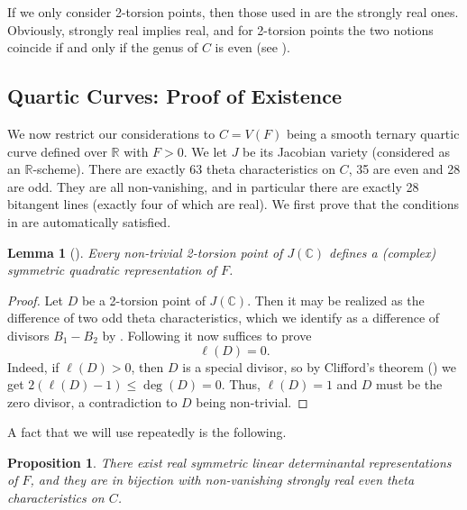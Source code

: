 \documentclass[a4paper,10pt]{amsart}
\theoremstyle{definition}
\theoremstyle{plain}
\newtheorem{prop}[Def]{Proposition}
\newtheorem{lem}[Def]{Lemma}
\newcommand{\C}{{\mathbb C}}
\newcommand{\R}{{\mathbb R}}
\begin{document}
If we only consider 2-torsion points, then those used in  are the strongly real ones. Obviously, strongly real implies real, and for 2-torsion points the two notions coincide if and only if the genus of $C$ is even (see \cite[Proposition 3.3]{grossharris}).



\subsection{Quartic Curves: Proof of Existence}

We now restrict our considerations to $C = V(F)$ being a smooth ternary quartic curve defined over $\R$ with $F > 0$. We let $J$ be its Jacobian variety (considered as an $\R$-scheme). There are exactly 63 theta characteristics on $C$, 35 are even and 28 are odd. They are all non-vanishing, and in particular there are exactly 28 bitangent lines (exactly four of which are real). We first prove that the conditions in  are automatically satisfied.


\begin{lem}[{\cite[Theorem 6.2.3]{dolgachev}}]
    Every non-trivial 2-torsion point of $J(\C)$ defines a (complex) symmetric quadratic representation of $F$.
\end{lem}

\begin{proof}
    Let $D$ be a 2-torsion point of $J(\C)$. Then it may be realized as the difference of two odd theta characteristics, which we identify as a difference of divisors $B_1 - B_2$ by . Following  it now suffices to prove
    \begin{equation*}
        \ell(D) = 0.
    \end{equation*}
    Indeed, if $\ell(D) > 0$, then $D$ is a special divisor, so by Clifford's theorem (\cite[Theorem IV.5.2]{Hart77}) we get $2(\ell(D)-1) \leq \deg(D) = 0$. Thus, $\ell(D) = 1$ and $D$ must be the zero divisor, a contradiction to $D$ being non-trivial.
\end{proof}

A fact that we will use repeatedly is the following.

\begin{prop} \label{prop:realsymmLDR}
    There exist real symmetric linear determinantal representations of $F$, and they are in bijection with non-vanishing strongly real even theta characteristics on $C$.
\end{prop}
\end{document}
